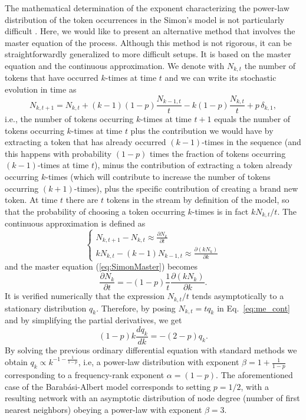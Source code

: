 \documentclass[graybox]{svmult}
\newcommand{\beq}{\begin{equation}}
\newcommand{\eeq}{\end{equation}}
\begin{document}
The mathematical determination of the exponent characterizing the power-law distribution of the token occurrences in the Simon's model is not particularly difficult \cite{simon-mandel-dispute,simkin2011}.
Here, we would like to present an alternative method that involves the master equation of the process.
Although this method is not rigorous, it can be straightforwardly generalized to more difficult setups.
It is based on the master equation and the continuous approximation.
We denote with $N_{k,t}$ the number of tokens that have occurred $k$-times at time $t$ and we can write its stochastic evolution in time as 
\beq
	N_{k,t+1} =  N_{k,t} + (k-1)(1-p)\frac{N_{k-1,t}}{t} - k (1-p) \frac{N_{k,t}}{t}  + p\,\delta_{k,1},
	\label{eq:SimonMaster}
\eeq
i.e., the number of tokens occurring $k$-times at time $t+1$ equals the number of tokens occurring $k$-times at time $t$ plus the contribution we would have by extracting a token that has already occurred $(k-1)$-times in the sequence (and this happens with probability $(1-p)$ times the fraction of tokens occurring $(k-1)$-times at time $t$), minus the contribution of extracting a token already occurring $k$-times (which will contribute to increase the number of tokens occurring $(k+1)$-times), plus the specific contribution of creating a brand new token.
At time $t$ there are $t$ tokens in the stream by definition of the model, so that the probability of choosing a token occurring $k$-times is in fact $kN_{k,t}/t$.
The continuous approximation is defined as 
\beq
	\left\{
		\begin{array}{l}
			  N_{k,t+1} - N_{k,t} \approx \frac{\partial N_k}{\partial t}\\
			  kN_{k,t} - (k-1)N_{k-1,t} \approx \frac{\partial (kN_k)}{\partial k}
		\end{array}	\right.
		\label{eq:contapprox}
\eeq
and the master equation (\ref{eq:SimonMaster}) becomes
 \beq
		\frac{\partial N_k}{\partial t} = -(1-p) \frac{1}{t} \frac{\partial (kN_k)}{\partial k}.
		\label{eq:me_cont}
\eeq
It is verified numerically that  the expression $N_{k,t}/t$ tends asymptotically  to a stationary distribution $q_k$.
Therefore, by posing $N_{k,t}=tq_k$ in Eq.~\ref{eq:me_cont} and by simplifying the partial derivatives, we get
\beq
		(1-p) k \frac{dq_k}{dk} = -(2-p) q_k.
		\label{eq:me_pconst}
\eeq
By solving the previous ordinary differential equation with standard methods we obtain 
\( q_k \propto k^{-1-\frac{1}{1-p}}\), 
i.e, a power-law distribution with exponent  $\beta = 1+\frac{1}{1-p}$ corresponding to a frequency-rank exponent $\alpha=(1-p)$.
The aforementioned case of the Barab\'asi-Albert model corresponds to setting $p=1/2$, with a resulting network with an asymptotic distribution of node degree (number of first nearest neighbors) obeying a power-law with exponent $\beta=3$.
\end{document}
